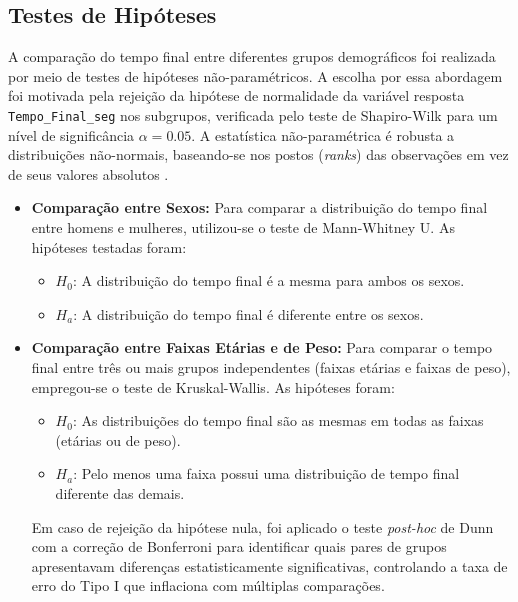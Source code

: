 \subsection{Testes de Hipóteses}

A comparação do tempo final entre diferentes grupos demográficos foi realizada por meio de testes de hipóteses não-paramétricos. A escolha por essa abordagem foi motivada pela rejeição da hipótese de normalidade da variável resposta \texttt{Tempo\_Final\_seg} nos subgrupos, verificada pelo teste de Shapiro-Wilk para um nível de significância $\alpha = 0.05$. A estatística não-paramétrica é robusta a distribuições não-normais, baseando-se nos postos (\textit{ranks}) das observações em vez de seus valores absolutos \cite{siegel1988}.

\begin{itemize}
    \item \textbf{Comparação entre Sexos:} Para comparar a distribuição do tempo final entre homens e mulheres, utilizou-se o teste de Mann-Whitney U. As hipóteses testadas foram:
    \begin{itemize}
        \item $H_0$: A distribuição do tempo final é a mesma para ambos os sexos.
        \item $H_a$: A distribuição do tempo final é diferente entre os sexos.
    \end{itemize}
    
    \item \textbf{Comparação entre Faixas Etárias e de Peso:} Para comparar o tempo final entre três ou mais grupos independentes (faixas etárias e faixas de peso), empregou-se o teste de Kruskal-Wallis. As hipóteses foram:
    \begin{itemize}
        \item $H_0$: As distribuições do tempo final são as mesmas em todas as faixas (etárias ou de peso).
        \item $H_a$: Pelo menos uma faixa possui uma distribuição de tempo final diferente das demais.
    \end{itemize}
    Em caso de rejeição da hipótese nula, foi aplicado o teste \textit{post-hoc} de Dunn com a correção de Bonferroni para identificar quais pares de grupos apresentavam diferenças estatisticamente significativas, controlando a taxa de erro do Tipo I que inflaciona com múltiplas comparações.
\end{itemize}

